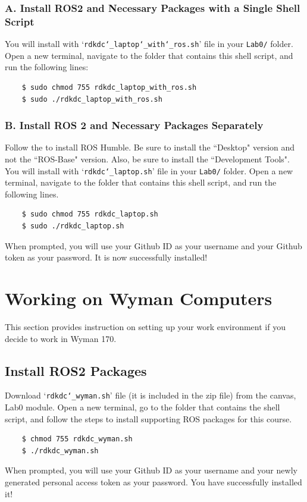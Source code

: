 \documentclass[hidelinks]{article}
\begin{document}
\subsubsection*{A. Install ROS2 and Necessary Packages with a Single Shell Script}
You will install with `\texttt{rdkdc\char`_laptop\char`_with\char`_ros.sh}' file in your  \verb+Lab0/+ folder. Open a new terminal, navigate to the folder that contains this shell script, and run the following lines:
\begin{Verbatim}
	$ sudo chmod 755 rdkdc_laptop_with_ros.sh
	$ sudo ./rdkdc_laptop_with_ros.sh
\end{Verbatim}

\subsubsection*{B. Install ROS 2 and Necessary Packages Separately}
Follow the \href{https://docs.ros.org/en/humble/Installation/Ubuntu-Install-Debians.html}{\color{blue}{instructions}} to install ROS Humble. Be sure to install the ``Desktop" version and not the ``ROS-Base" version. Also, be sure to install the ``Development Tools".\\

You will install with `\texttt{rdkdc\char`_laptop.sh}' file in your  \verb+Lab0/+ folder. Open a new terminal, navigate to the folder that contains this shell script, and run the following lines.
\begin{Verbatim}
	$ sudo chmod 755 rdkdc_laptop.sh
	$ sudo ./rdkdc_laptop.sh
\end{Verbatim}

When prompted, you will use your Github ID as your username and your Github token as your password. It is now successfully installed!

\section*{Working on Wyman Computers}

This section provides instruction on setting up your work environment if you decide to work in Wyman 170.

\setcounter{subsection}{0}
\subsection{Install ROS2 Packages}
Download `\texttt{rdkdc\char`_wyman.sh}' file (it is included in the zip file) from the canvas, Lab0 module. Open a new terminal, go to the folder that contains the shell script, and follow the steps to install supporting ROS packages for this course.
\begin{Verbatim}
	$ chmod 755 rdkdc_wyman.sh
	$ ./rdkdc_wyman.sh
\end{Verbatim}
When prompted, you will use your Github ID as your username and your newly generated personal access token as your password. You have successfully installed it!
\end{document}
